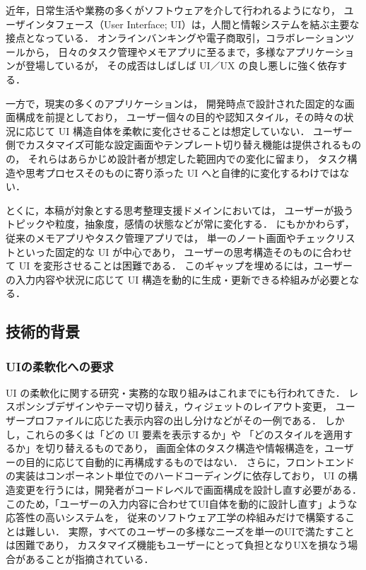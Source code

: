 \documentclass[a4paper,10pt]{jarticle}
\begin{document}
近年，日常生活や業務の多くがソフトウェアを介して行われるようになり，
ユーザインタフェース（User Interface; UI）は，人間と情報システムを結ぶ主要な接点となっている．
オンラインバンキングや電子商取引，コラボレーションツールから，
日々のタスク管理やメモアプリに至るまで，多様なアプリケーションが登場しているが，
その成否はしばしば UI／UX の良し悪しに強く依存する\cite{nielsen2012usability}．

一方で，現実の多くのアプリケーションは，
開発時点で設計された固定的な画面構成を前提としており，
ユーザー個々の目的や認知スタイル，その時々の状況に応じて
UI 構造自体を柔軟に変化させることは想定していない．
ユーザー側でカスタマイズ可能な設定画面やテンプレート切り替え機能は提供されるものの，
それらはあらかじめ設計者が想定した範囲内での変化に留まり，
タスク構造や思考プロセスそのものに寄り添った UI へと自律的に変化するわけではない．

とくに，本稿が対象とする思考整理支援ドメインにおいては，
ユーザーが扱うトピックや粒度，抽象度，感情の状態などが常に変化する．
にもかかわらず，従来のメモアプリやタスク管理アプリでは，
単一のノート画面やチェックリストといった固定的な UI が中心であり，
ユーザーの思考構造そのものに合わせて UI を変形させることは困難である．
このギャップを埋めるには，ユーザーの入力内容や状況に応じて UI 構造を動的に生成・更新できる枠組みが必要となる．

\subsection{技術的背景}

\subsubsection{UIの柔軟化への要求}

UI の柔軟化に関する研究・実務的な取り組みはこれまでにも行われてきた．
レスポンシブデザインやテーマ切り替え，ウィジェットのレイアウト変更，
ユーザープロファイルに応じた表示内容の出し分けなどがその一例である．
しかし，これらの多くは「どの UI 要素を表示するか」や
「どのスタイルを適用するか」を切り替えるものであり，
画面全体のタスク構造や情報構造を，ユーザーの目的に応じて自動的に再構成するものではない．
さらに，フロントエンドの実装はコンポーネント単位でのハードコーディングに依存しており，
UI の構造変更を行うには，開発者がコードレベルで画面構成を設計し直す必要がある．
このため，「ユーザーの入力内容に合わせてUI自体を動的に設計し直す」ような応答性の高いシステムを，
従来のソフトウェア工学の枠組みだけで構築することは難しい．
実際，すべてのユーザーの多様なニーズを単一のUIで満たすことは困難であり\cite{grundy2022diverse}，
カスタマイズ機能もユーザーにとって負担となりUXを損なう場合があることが指摘されている\cite{nielsen2009customization,nielsen2016simplicity}．
\end{document}
